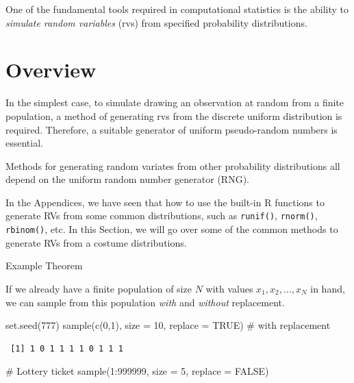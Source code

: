 \documentclass[
  letterpaper,
  DIV=11,
  numbers=noendperiod]{scrreprt}
\newenvironment{Shaded}{\begin{snugshade}}{\end{snugshade}}
\newcommand{\AttributeTok}[1]{\textcolor[rgb]{0.40,0.45,0.13}{#1}}
\newcommand{\CommentTok}[1]{\textcolor[rgb]{0.37,0.37,0.37}{#1}}
\newcommand{\ConstantTok}[1]{\textcolor[rgb]{0.56,0.35,0.01}{#1}}
\newcommand{\DecValTok}[1]{\textcolor[rgb]{0.68,0.00,0.00}{#1}}
\newcommand{\FunctionTok}[1]{\textcolor[rgb]{0.28,0.35,0.67}{#1}}
\newcommand{\NormalTok}[1]{\textcolor[rgb]{0.00,0.23,0.31}{#1}}
\newcommand{\SpecialCharTok}[1]{\textcolor[rgb]{0.37,0.37,0.37}{#1}}
\begin{document}
One of the fundamental tools required in computational statistics is the
ability to \emph{simulate random variables} (rvs) from specified
probability distributions.

\section{Overview}\label{overview}

In the simplest case, to simulate drawing an observation at random from
a finite population, a method of generating rvs from the discrete
uniform distribution is required. Therefore, a suitable generator of
uniform pseudo-random numbers is essential.

Methods for generating random variates from other probability
distributions all depend on the uniform random number generator (RNG).

In the Appendices, we have seen that how to use the built-in R functions
to generate RVs from some common distributions, such as
\texttt{runif()}, \texttt{rnorm()}, \texttt{rbinom()}, etc. In this
Section, we will go over some of the common methods to generate RVs from
a costume distributions.

Example Theorem

If we already have a finite population of size \(N\) with values
\(x_1, x_2, \ldots, x_N\) in hand, we can sample from this population
\emph{with} and \emph{without} replacement.

\begin{Shaded}
\begin{Highlighting}[]
\FunctionTok{set.seed}\NormalTok{(}\DecValTok{777}\NormalTok{)}
\FunctionTok{sample}\NormalTok{(}\FunctionTok{c}\NormalTok{(}\DecValTok{0}\NormalTok{,}\DecValTok{1}\NormalTok{), }\AttributeTok{size =} \DecValTok{10}\NormalTok{, }\AttributeTok{replace =} \ConstantTok{TRUE}\NormalTok{)  }\CommentTok{\# with replacement}
\end{Highlighting}
\end{Shaded}

\begin{verbatim}
 [1] 1 0 1 1 1 1 0 1 1 1
\end{verbatim}

\begin{Shaded}
\begin{Highlighting}[]
\CommentTok{\# Lottery ticket}
\FunctionTok{sample}\NormalTok{(}\DecValTok{1}\SpecialCharTok{:}\DecValTok{999999}\NormalTok{, }\AttributeTok{size =} \DecValTok{5}\NormalTok{, }\AttributeTok{replace =} \ConstantTok{FALSE}\NormalTok{)}
\end{Highlighting}
\end{Shaded}
\end{document}
